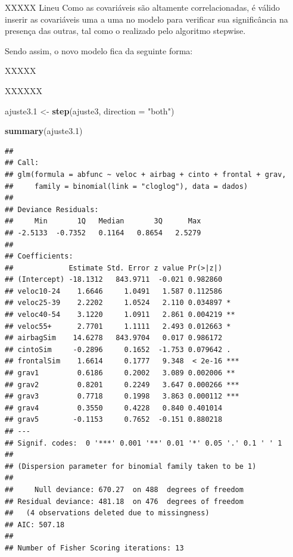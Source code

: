 \documentclass[]{article}
\newenvironment{Shaded}{\begin{snugshade}}{\end{snugshade}}
\newcommand{\KeywordTok}[1]{\textcolor[rgb]{0.13,0.29,0.53}{\textbf{{#1}}}}
\newcommand{\DataTypeTok}[1]{\textcolor[rgb]{0.13,0.29,0.53}{{#1}}}
\newcommand{\FloatTok}[1]{\textcolor[rgb]{0.00,0.00,0.81}{{#1}}}
\newcommand{\StringTok}[1]{\textcolor[rgb]{0.31,0.60,0.02}{{#1}}}
\newcommand{\NormalTok}[1]{{#1}}
\begin{document}
XXXXX Lineu Como as covariáveis são altamente correlacionadas, é válido
inserir as covariáveis uma a uma no modelo para verificar sua
significância na presença das outras, tal como o realizado pelo
algoritmo stepwise.

Sendo assim, o novo modelo fica da seguinte forma:

XXXXX

XXXXXX

\begin{Shaded}
\begin{Highlighting}[]
\NormalTok{ajuste3}\FloatTok{.1} \NormalTok{<-}\StringTok{ }\KeywordTok{step}\NormalTok{(ajuste3, }\DataTypeTok{direction =} \StringTok{"both"}\NormalTok{)}
\end{Highlighting}
\end{Shaded}

\begin{Shaded}
\begin{Highlighting}[]
\KeywordTok{summary}\NormalTok{(ajuste3}\FloatTok{.1}\NormalTok{)}
\end{Highlighting}
\end{Shaded}

\begin{verbatim}
## 
## Call:
## glm(formula = abfunc ~ veloc + airbag + cinto + frontal + grav, 
##     family = binomial(link = "cloglog"), data = dados)
## 
## Deviance Residuals: 
##     Min       1Q   Median       3Q      Max  
## -2.5133  -0.7352   0.1164   0.8654   2.5279  
## 
## Coefficients:
##             Estimate Std. Error z value Pr(>|z|)    
## (Intercept) -18.1312   843.9711  -0.021 0.982860    
## veloc10-24    1.6646     1.0491   1.587 0.112586    
## veloc25-39    2.2202     1.0524   2.110 0.034897 *  
## veloc40-54    3.1220     1.0911   2.861 0.004219 ** 
## veloc55+      2.7701     1.1111   2.493 0.012663 *  
## airbagSim    14.6278   843.9704   0.017 0.986172    
## cintoSim     -0.2896     0.1652  -1.753 0.079642 .  
## frontalSim    1.6614     0.1777   9.348  < 2e-16 ***
## grav1         0.6186     0.2002   3.089 0.002006 ** 
## grav2         0.8201     0.2249   3.647 0.000266 ***
## grav3         0.7718     0.1998   3.863 0.000112 ***
## grav4         0.3550     0.4228   0.840 0.401014    
## grav5        -0.1153     0.7652  -0.151 0.880218    
## ---
## Signif. codes:  0 '***' 0.001 '**' 0.01 '*' 0.05 '.' 0.1 ' ' 1
## 
## (Dispersion parameter for binomial family taken to be 1)
## 
##     Null deviance: 670.27  on 488  degrees of freedom
## Residual deviance: 481.18  on 476  degrees of freedom
##   (4 observations deleted due to missingness)
## AIC: 507.18
## 
## Number of Fisher Scoring iterations: 13
\end{verbatim}
\end{document}
